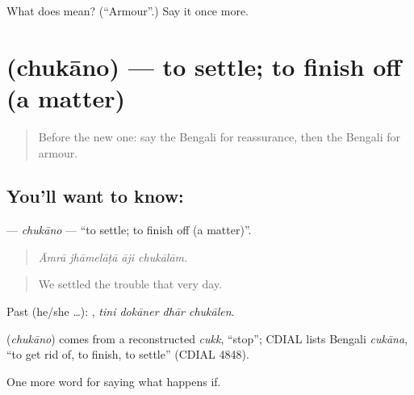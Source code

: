 \begin{tcolorbox}[breakable,colback=teal!4,colframe=teal!35!black,title={Before you move on}]
What does  mean? (\textquotedblleft{}Armour\textquotedblright{}.) Say it once more.
\end{tcolorbox}
\section[\texorpdfstring{\bn{চুকানো} (chukāno)}{চুকানো (chukāno)}]{ (chukāno) — to settle; to finish off (a matter)}

\label{lesson:BN-C540-chukano}



\begin{quote}
Before the new one: say the Bengali for reassurance, then the Bengali for armour.
\end{quote}

\subsection*{You'll want to know: }
\textbf{} — \emph{chukāno} — \textquotedblleft{}to settle; to finish off (a matter)\textquotedblright{}.

\begin{quote}
   
\end{quote}

\begin{quote}
\emph{Āmrā jhāmelāṭā āji chukālām.}
\end{quote}

\begin{quote}
We settled the trouble that very day.
\end{quote}

Past (he/she …):    , \emph{tini dokāner dhār chukālen}.

\begin{cousinweb}
\textbf{} (\emph{chukāno}) comes from a reconstructed \emph{cukk}, \textquotedblleft{}stop\textquotedblright{}; CDIAL lists Bengali \emph{cukāna}, \textquotedblleft{}to get rid of, to finish, to settle\textquotedblright{} (CDIAL 4848).
\end{cousinweb}

\begin{grammarlens}[title={What you've built}]
One more word for saying what happens if.
\end{grammarlens}

